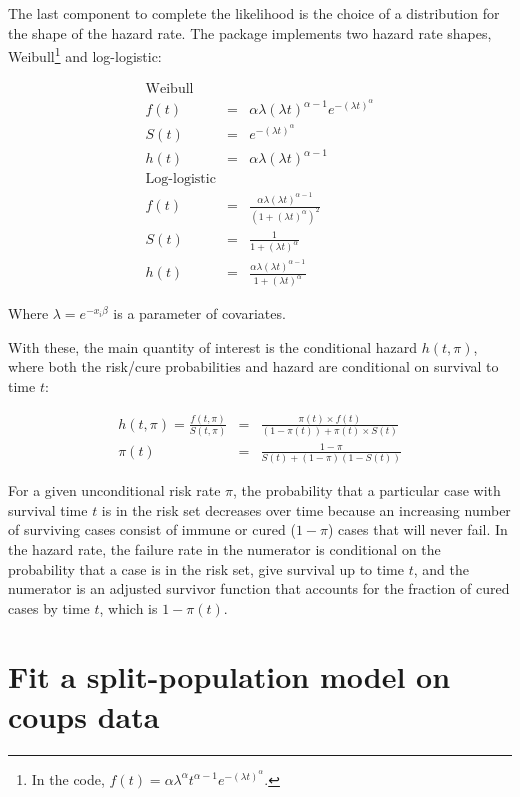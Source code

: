 \documentclass[article]{jss}
\begin{document}
The last component to complete the likelihood is the choice of a
distribution for the shape of the hazard rate. The 
package implements two hazard rate shapes,
Weibull\footnote{In the code, $f(t) = \alpha \lambda^{\alpha} t^{\alpha - 1} e^{-(\lambda t)^\alpha}$.}
and log-logistic:

\begin{eqnarray*}
\textrm{Weibull} \\
 f(t) & = & \alpha \lambda (\lambda t)^{\alpha - 1} e^{-(\lambda t)^\alpha} \\
  S(t) & = & e^{ -(\lambda t )^\alpha } \\
 h(t) & = & \alpha \lambda (\lambda t)^{\alpha-1} \\
\textrm{Log-logistic} \\
 f(t) & = & \frac{ \alpha \lambda (\lambda t)^{\alpha-1} }{ (1 + (\lambda t)^\alpha)^2 } \\
 S(t) & = & \frac{1}{ 1+  (\lambda t)^\alpha }  \\
 h(t) & = & \frac{ \alpha \lambda (\lambda t)^{\alpha-1} }{ 1+  (\lambda t)^\alpha }
\end{eqnarray*}

Where \(\lambda = e^{-x_i\beta}\) is a parameter of covariates.

With these, the main quantity of interest is the conditional hazard
\(h(t, \pi)\), where both the risk/cure probabilities and hazard are
conditional on survival to time \(t\):

\begin{eqnarray}
h(t, \pi) = \frac{f(t, \pi)}{S(t, \pi)} & = & \frac{ \pi(t) \times f(t) }{ (1-\pi(t)) + \pi(t) \times S(t) } \\
 \pi(t) & = & \frac{ 1-\pi }{ S(t) + (1-\pi) (1 - S(t)) }
\end{eqnarray}

For a given unconditional risk rate \(\pi\), the probability that a
particular case with survival time \(t\) is in the risk set decreases
over time because an increasing number of surviving cases consist of
immune or cured (\(1-\pi\)) cases that will never fail. In the hazard
rate, the failure rate in the numerator is conditional on the
probability that a case is in the risk set, give survival up to time
\(t\), and the numerator is an adjusted survivor function that accounts
for the fraction of cured cases by time \(t\), which is \(1-\pi(t)\).

\section{Fit a split-population model on coups
data}\label{fit-a-split-population-model-on-coups-data}
\end{document}
